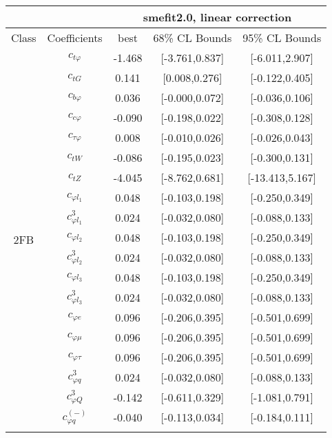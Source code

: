 \documentclass{article}
\begin{document}
\begin{table}[H]
\centering
\begin{tabular}{|c|c|c|c|c|}
\hline
 &  & \multicolumn{3}{c|}{smefit2.0, linear correction}  \\ \hline
Class & Coefficients & best & 68\% CL Bounds & 95\% CL Bounds\\ \hline
\multirow{23}{*}{2FB}
 & $c_{t \varphi}$ & -1.468 & [-3.761,0.837] & [-6.011,2.907]  \\ \cline{2-5}
 & $c_{tG}$ & 0.141 & [0.008,0.276] & [-0.122,0.405]  \\ \cline{2-5}
 & $c_{b \varphi}$ & 0.036 & [-0.000,0.072] & [-0.036,0.106]  \\ \cline{2-5}
 & $c_{c \varphi}$ & -0.090 & [-0.198,0.022] & [-0.308,0.128]  \\ \cline{2-5}
 & $c_{\tau \varphi}$ & 0.008 & [-0.010,0.026] & [-0.026,0.043]  \\ \cline{2-5}
 & $c_{tW}$ & -0.086 & [-0.195,0.023] & [-0.300,0.131]  \\ \cline{2-5}
 & $c_{tZ}$ & -4.045 & [-8.762,0.681] & [-13.413,5.167]  \\ \cline{2-5}
 & $c_{\varphi l_1}$ & 0.048 & [-0.103,0.198] & [-0.250,0.349]  \\ \cline{2-5}
 & $c_{\varphi l_1}^{3}$ & 0.024 & [-0.032,0.080] & [-0.088,0.133]  \\ \cline{2-5}
 & $c_{\varphi l_2}$ & 0.048 & [-0.103,0.198] & [-0.250,0.349]  \\ \cline{2-5}
 & $c_{\varphi l_2}^{3}$ & 0.024 & [-0.032,0.080] & [-0.088,0.133]  \\ \cline{2-5}
 & $c_{\varphi l_3}$ & 0.048 & [-0.103,0.198] & [-0.250,0.349]  \\ \cline{2-5}
 & $c_{\varphi l_3}^{3}$ & 0.024 & [-0.032,0.080] & [-0.088,0.133]  \\ \cline{2-5}
 & $c_{\varphi e}$ & 0.096 & [-0.206,0.395] & [-0.501,0.699]  \\ \cline{2-5}
 & $c_{\varphi \mu}$ & 0.096 & [-0.206,0.395] & [-0.501,0.699]  \\ \cline{2-5}
 & $c_{\varphi \tau}$ & 0.096 & [-0.206,0.395] & [-0.501,0.699]  \\ \cline{2-5}
 & $c_{\varphi q}^{3}$ & 0.024 & [-0.032,0.080] & [-0.088,0.133]  \\ \cline{2-5}
 & $c_{\varphi Q}^{3}$ & -0.142 & [-0.611,0.329] & [-1.081,0.791]  \\ \cline{2-5}
 & $c_{\varphi q}^{(-)}$ & -0.040 & [-0.113,0.034] & [-0.184,0.111]  \\ \cline{2-5}

\end{tabular}
\end{table}
\end{document}
